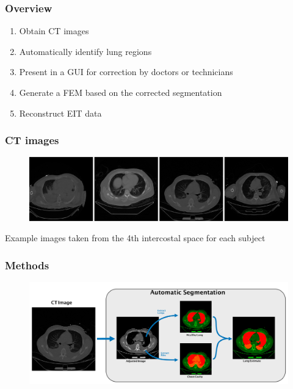 \documentclass[10pt,    %
    english,            %
    xcolor=table,       %
    envcountsect,        %
    aspectratio=1610
]{beamer}
\begin{document}
\begin{frame}
	\frametitle{Overview}    
	\begin{enumerate}
		\item Obtain CT images
		\item Automatically identify lung regions  
		\item Present in a GUI for correction by doctors or technicians
		\item Generate a FEM based on the corrected segmentation
		\item Reconstruct EIT data
	\end{enumerate}
\end{frame}
 
 \begin{frame}
 	\frametitle{CT images}    
		\begin{figure}[H]
			\centering
			\includegraphics[width=\textwidth]{raw_ct_imgs.png}
		\end{figure}
	Example images taken from the 4th intercostal space for each subject
 \end{frame}
 
\begin{frame}
	\frametitle{Methods}    
		\begin{figure}[H]
			\centering
			\includegraphics[width=\textwidth]{lung_segmentation_methods_a.pdf}
		\end{figure}
\end{frame}
\end{document}
